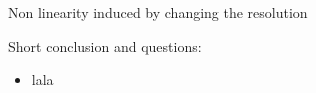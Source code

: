 \documentclass[francais]{beamer}
\begin{document}
\begin{frame}
\begin{center}
 \large{Non linearity induced by changing the resolution}
\end{center}
\end{frame}






\begin{frame}{Short conclusion and questions:}
\begin{itemize}
\item lala
\end{itemize}
\end{frame}


\usebackgroundtemplate{}
\end{document}
